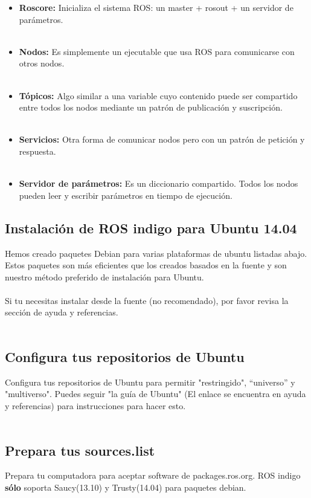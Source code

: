 \documentclass[user_manual.tex]{subfiles}
\begin{document}
\begin{itemize}
\item \textbf{Roscore:} Inicializa el sistema ROS: un master + rosout + un servidor de parámetros.\\
\\	
\item \textbf{Nodos:} Es simplemente un ejecutable que usa ROS para comunicarse con otros nodos.\\
\\
\item \textbf{Tópicos:} Algo similar a una variable cuyo contenido puede ser compartido entre todos los nodos mediante un patrón de
publicación y suscripción.\\
\\
\item \textbf{Servicios:} Otra forma de comunicar nodos pero con un patrón de petición y respuesta.\\
\\
\item \textbf{Servidor de parámetros:} Es un diccionario compartido. Todos los nodos pueden leer y escribir parámetros en tiempo de ejecución.\\
\end{itemize}

\subsection{Instalación de ROS indigo para Ubuntu 14.04}
Hemos creado paquetes Debian para varias plataformas de ubuntu listadas abajo. Estos paquetes son más eficientes que 
los creados basados en la fuente y son nuestro método preferido de instalación para Ubuntu.\\
\\
Si tu necesitas instalar desde la fuente (no recomendado), por favor revisa la sección de ayuda y referencias.\\
\\
\subsection{Configura tus repositorios de Ubuntu}
Configura tus repositorios de Ubuntu para permitir "restringido", ``universo'' y "multiverso". Puedes seguir "la guía de 
Ubuntu" (El enlace se encuentra en ayuda y referencias) para instrucciones para hacer esto.\\
\\
\subsection{Prepara tus sources.list}
Prepara tu computadora para aceptar software de packages.ros.org. ROS indigo \textbf{sólo} soporta Saucy(13.10) y 
Trusty(14.04) para paquetes debian.
\end{document}
